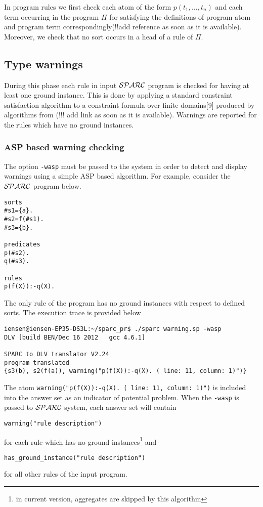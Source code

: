\documentclass[12pt, letterpaper]{article}
\begin{document}
In program rules we first check each atom of the form $p(t_1,\dots,t_n)$ and each term occurring in the program $\Pi$ for satisfying
the definitions of program atom and program term correspondingly(!!add reference as soon as it is available). Moreover, we check that no sort occurs in a head of a rule of $\Pi$.
\subsection{Type warnings}\label{type_warnings}
During this phase each rule in input ${\cal SPARC}$ program is checked for having at least one ground instance. This is done by applying a standard constraint
satisfaction algorithm to a constraint formula over finite domains[9] produced by algorithms from (!!! add link as soon as it is available).
Warnings are reported for the rules which have no ground instances.
\subsubsection{ASP based warning checking}
The option \texttt{-wasp} must be passed to the  system  in order to detect and display warnings using a simple ASP based algorithm.
For example, consider the ${\cal SPARC}$ program below.

\begin{verbatim}
sorts
#s1={a}.
#s2=f(#s1).
#s3={b}.

predicates
p(#s2).
q(#s3).

rules
p(f(X)):-q(X).
\end{verbatim}

The only rule of the program has no ground instances with respect to defined sorts.
The execution trace is provided below
\begin{verbatim}
iensen@iensen-EP35-DS3L:~/sparc_pr$ ./sparc warning.sp -wasp 
DLV [build BEN/Dec 16 2012   gcc 4.6.1]

SPARC to DLV translator V2.24
program translated
{s3(b), s2(f(a)), warning("p(f(X)):-q(X). ( line: 11, column: 1)")}
\end{verbatim}

The atom \texttt{warning("p(f(X)):-q(X). ( line: 11, column: 1)")} is included into the answer set as an indicator of potential problem.
When the \texttt{-wasp} is passed to ${\cal SPARC}$ system, each answer set will contain 
\begin{verbatim}
warning("rule description") 
\end{verbatim}
for each rule which has no ground instances\footnote{in current version, aggregates are skipped by this algorithm} and 
\begin{verbatim}
has_ground_instance("rule description")
\end{verbatim}
\st
for all other rules of the input program.
\end{document}
